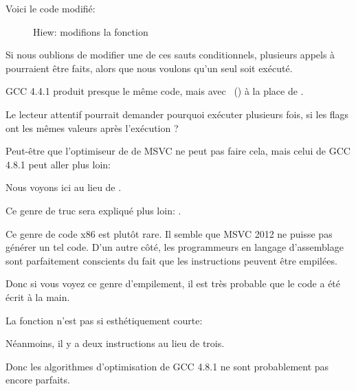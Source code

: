 \clearpage
Voici le code modifié:

\begin{figure}[H]
\centering
{}
\caption{Hiew: modifions la fonction }
\label{fig:jcc_hiew_2}
\end{figure}

Si nous oublions de modifier une de ces sauts conditionnels, plusieurs appels à \printf
pourraient être faits, alors que nous voulons qu'un seul soit exécuté.


GCC 4.4.1 \NonOptimizing produit presque le même code, mais avec \puts~()
à la place de \printf.


Le lecteur attentif pourrait demander pourquoi exécuter \CMP plusieurs fois, si
les flags ont les mêmes valeurs après l'exécution ?

Peut-être que l'optimiseur de de MSVC ne peut pas faire cela, mais celui de GCC
4.8.1 peut aller plus loin:



Nous voyons ici  au lieu de .

Ce genre de truc sera expliqué plus loin: .

Ce genre de code x86 est plutôt rare.
Il semble que MSVC 2012 ne puisse pas générer un tel code.
D'un autre côté, les programmeurs en langage d'assemblage sont parfaitement conscients
du fait que les instructions  peuvent être empilées.

Donc si vous voyez ce genre d'empilement, il est très probable que le code a été
écrit à la main.

La fonction  n'est pas si esthétiquement courte:



Néanmoins, il y a deux instructions  au lieu de trois.

Donc les algorithmes d'optimisation de GCC 4.8.1 ne sont probablement pas encore parfaits.

